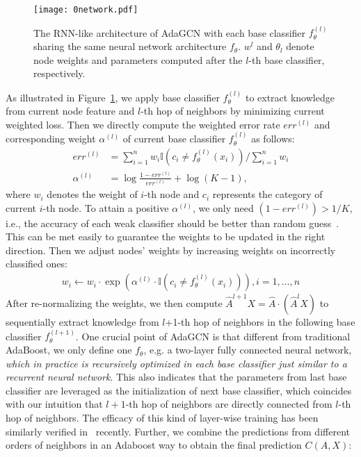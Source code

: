 \documentclass{article} \usepackage{iclr2021_conference,times}
\begin{document}
\begin{figure}[t!]
	\centering
	\texttt{[image: 0network.pdf]}
	\caption{The RNN-like architecture of AdaGCN with each base classifier $f_{\theta}^{(l)}$ sharing the same neural network architecture $f_{\theta}$. $w^l$ and $\theta_l$ denote node weights and parameters computed after the $l$-th base classifier, respectively.}
	\label{figure_network}
\end{figure}

As illustrated in Figure~\ref{figure_network}, we apply base classifier $f_{\theta}^{(l)}$ to extract knowledge from current node feature and $l$-th hop of neighbors by minimizing current weighted loss. Then we directly compute the weighted error rate $err^{(l)}$ and corresponding weight $\alpha^{(l)}$ of current base classifier $f_{\theta}^{(l)}$ as follows:
\begin{equation} 
\label{eq_err}
\begin{aligned} 
err^{(l)}&=\sum_{i=1}^{n} w_{i} \mathbb{I}\left(c_{i} \neq f_\theta^{(l)}\left(x_{i}\right)\right) / \sum_{i=1}^{n} w_{i}\\
\alpha^{(l)}&=\log \frac{1-err^{(l)}}{err^{(l)}}+\log (K-1),
\end{aligned} 
\end{equation}
where $w_i$ denotes the weight of $i$-th node and $c_i$ represents the category of current $i$-th node. To attain a positive $\alpha^{(l)}$, we only need $(1-err^{(l)})>1/K$, i.e., the accuracy of each weak classifier should be better than random guess~\citep{hastie2009multi}. This can be met easily to guarantee the weights to be updated in the right direction. Then we adjust nodes' weights by increasing weights on incorrectly classified ones:
\begin{equation} 
\begin{aligned}
w_{i} \leftarrow w_{i} \cdot \exp \left(\alpha^{(l)} \cdot \mathbb{I}\left(c_{i} \neq f_{\theta}^{(l)}\left(x_{i}\right)\right)\right), i=1, \ldots, n 
\end{aligned} 
\end{equation}	
After re-normalizing the weights, we then compute $\hat{A}^{l+1}X=\hat{A} \cdot (\hat{A}^l X)$ to sequentially extract knowledge from $l$+1-th hop of neighbors in the following base classifier $f_{\theta}^{(l+1)}$. One crucial point of AdaGCN is that different from traditional AdaBoost, we only define one $f_{\theta}$, e.g. a two-layer fully connected neural network, \emph{which in practice is recursively optimized in each base classifier just similar to a recurrent neural network}. This also indicates that the parameters from last base classifier are leveraged as the initialization of next base classifier, which coincides with our intuition that $l+1$-th hop of neighbors are directly connected from $l$-th hop of neighbors. The efficacy of this kind of layer-wise training has been similarly verified in~\citep{belilovsky2018greedy} recently. Further, we combine the predictions from different orders of neighbors in an Adaboost way to obtain the final prediction $C(A,X)$:
\end{document}
